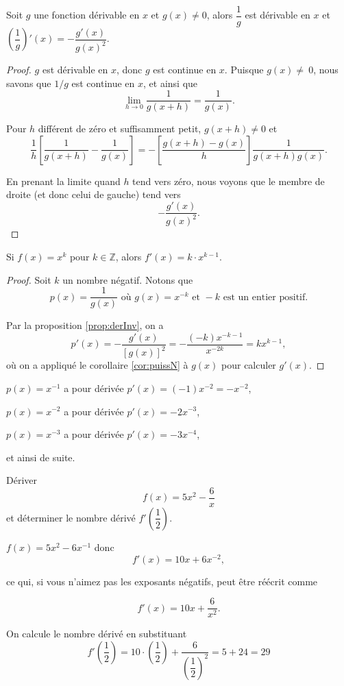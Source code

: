 \documentclass[a4paper,12pt]{article}
\begin{document}
\begin{prop}[label=prop:derInv]
   \tcblower
   Soit $g$ une fonction dérivable en $x$ et $g(x)\neq 0$, alors $\dfrac{1}{g}$ est dérivable en $x$ et $\left(\dfrac{1}{g}\right)'(x)=-\dfrac{g'(x)}{g(x)^2}$. 
   \medskip

   \begin{proof}
   	 $g$ est dérivable en $x$, donc $g$ est continue en $x$. Puisque $g(x)\neq~0$, nous savons que $1/g$ est continue en $x$, et ainsi que
   	$$\lim_{h \to 0} \frac{1}{g(x+h)} = \frac{1}{g(x)}.$$
   	
   	Pour $h$ différent de zéro et suffisamment petit, $g(x+h) \neq 0$ et
   	$$\frac{1}{h}\left[\frac{1}{g(x+h)} - \frac{1}{g(x)}\right] = -\left[\frac{g(x+h) - g(x)}{h}\right]\frac{1}{g(x+h)g(x)}.$$
   	
   	En prenant la limite quand $h$ tend vers zéro, nous voyons que le membre de droite (et donc celui de gauche) tend vers
   	$$-\frac{g'(x)}{g(x)^2}.$$
   \end{proof}
\end{prop}

\begin{coro}
   \tcblower
   Si $f(x)=x^k$ pour $k\in \mathbb{Z}$, alors $f'(x)=k\cdot x^{k-1}$.
   \medskip

   \begin{proof}
Soit $k$ un nombre négatif. Notons que
   	$$p(x) = \frac{1}{g(x)} \text{ où } g(x) = x^{-k} \text{ et } -k \text{ est un entier positif}.$$
   	
	Par la proposition \ref{prop:derInv}, on a
   	$$p'(x) = -\frac{g'(x)}{[g(x)]^2} = -\frac{(-k)x^{-k-1}}{x^{-2k}} = kx^{k-1},$$
	où on a appliqué le corollaire \ref{cor:puissN} à $g(x)$ pour calculer $g'(x)$.
   \end{proof}
\end{coro}

\begin{exemple}
   \tcblower
   $p(x) = x^{-1}$ a pour dérivée $p'(x) = (-1)x^{-2} = -x^{-2}$,
   
   $p(x) = x^{-2}$ a pour dérivée $p'(x) = -2x^{-3}$,
   
   $p(x) = x^{-3}$ a pour dérivée $p'(x) = -3x^{-4}$,
   
   et ainsi de suite.
\end{exemple}

\begin{exemple}
   \tcblower
  Dériver 
   $$f(x) = 5x^2 - \frac{6}{x}$$ et déterminer le nombre dérivé $f'\left(\dfrac{1}{2}\right)$.

   $f(x) = 5x^2 - 6x^{-1}$ donc
   $$f'(x) = 10x + 6x^{-2},$$
   
   ce qui, si vous n'aimez pas les exposants négatifs, peut être réécrit comme

   $$f'(x) = 10x + \frac{6}{x^2}.$$

   On calcule le nombre dérivé en substituant 
   \[f'\left(\dfrac{1}{2}\right)=10\cdot \left(\dfrac{1}{2}\right) + \dfrac{6}{\left(\dfrac{1}{2}\right)^2}=5+24=29\]
\end{exemple}
\end{document}
